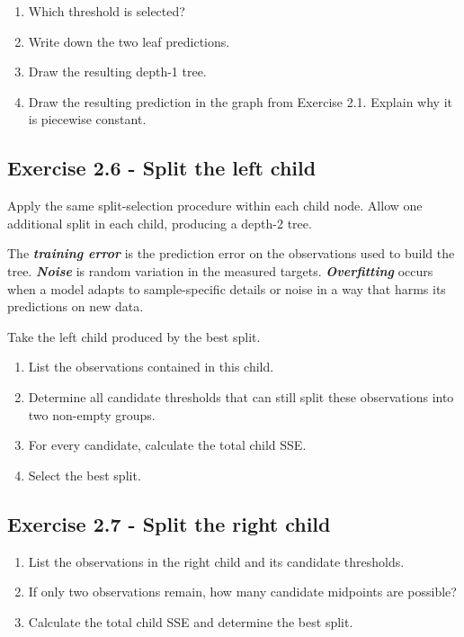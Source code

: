 \documentclass{course_sheet}
\begin{document}
\begin{enumerate}
\item
Which threshold is selected?

\item
Write down the two leaf predictions.

\item
Draw the resulting depth-1 tree.

\item
Draw the resulting prediction in the graph from Exercise 2.1. Explain why it is piecewise constant.

\end{enumerate}
\subsection*{Exercise 2.6 - Split the left child}
Apply the same split-selection procedure within each child node. Allow one additional split in each child, producing a depth-2 tree.

The \textbf{\textit{training error}} is the prediction error on the observations used to build the tree. \textbf{\textit{Noise}} is random variation in the measured targets. \textbf{\textit{Overfitting}} occurs when a model adapts to sample-specific details or noise in a way that harms its predictions on new data.

Take the left child produced by the best split.

\begin{enumerate}
\item
List the observations contained in this child.

\item
Determine all candidate thresholds that can still split these observations into two non-empty groups.

\item
For every candidate, calculate the total child SSE.

\item
Select the best split.

\end{enumerate}
\subsection*{Exercise 2.7 - Split the right child}
\begin{enumerate}
\item
List the observations in the right child and its candidate thresholds.

\item
If only two observations remain, how many candidate midpoints are possible?

\item
Calculate the total child SSE and determine the best split.

\end{enumerate}
\end{document}
